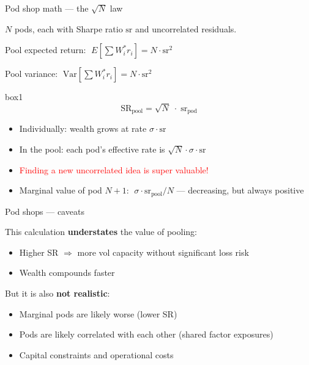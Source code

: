 \documentclass[aspectratio=169,10pt]{beamer}
\begin{document}

\begin{frame}{Pod shop math --- the $\sqrt{N}$ law}

$N$ pods, each with Sharpe ratio $\text{sr}$ and uncorrelated residuals.

\vskip 8pt

Pool expected return: $\;E\left[\sum W_i^* r_i\right] = N \cdot \text{sr}^2$

\vskip 5pt

Pool variance: $\;\text{Var}\left[\sum W_i^* r_i\right] = N \cdot \text{sr}^2$

\vskip 10pt

\begin{beamercolorbox}[rounded=true,sep=8pt]{box1}
$$\text{SR}_{\text{pool}} = \sqrt{N} \;\cdot\; \text{sr}_{\text{pod}}$$
\end{beamercolorbox}

\vskip 8pt

\begin{itemize}
\item Individually: wealth grows at rate $\sigma \cdot \text{sr}$
\item In the pool: each pod's effective rate is $\sqrt{N} \cdot \sigma \cdot \text{sr}$
\vskip 6pt
\item \textcolor{red}{Finding a new uncorrelated idea is super valuable!}
\vskip 6pt
\item Marginal value of pod $N{+}1$: $\;\sigma \cdot \text{sr}_{\text{pool}} / N$ --- decreasing, but always positive
\end{itemize}

\end{frame}


\begin{frame}{Pod shops --- caveats}

This calculation \textbf{understates} the value of pooling:
\begin{itemize}
\item Higher SR $\Rightarrow$ more vol capacity without significant loss risk
\item Wealth compounds faster
\end{itemize}

\vskip 10pt

But it is also \textbf{not realistic}:
\begin{itemize}
\item Marginal pods are likely worse (lower SR)
\item Pods are likely correlated with each other (shared factor exposures)
\item Capital constraints and operational costs
\end{itemize}

\end{frame}
\end{document}
